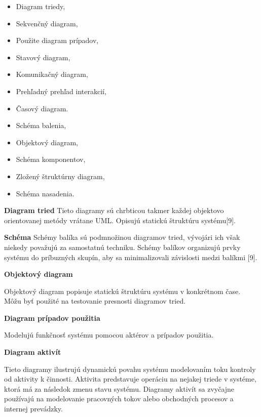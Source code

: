 \documentclass[a4paper]{feidippp}
\begin{document}
\begin{itemize}
\item	Diagram triedy,			
\item Sekvenčný diagram,
\item Použite diagram prípadov,
\item Stavový diagram,
\item Komunikačný diagram,
\item Prehľadný prehľad interakcií,
\item Časový diagram.
  
  \end{itemize}
  \begin{itemize}
      
  
\item Schéma balenia,
\item Objektový diagram,
\item Schéma komponentov,
\item Zložený štruktúrny diagram,
\item Schéma nasadenia.

\end{itemize}	


\textbf{ Diagram tried}
Tieto diagramy sú chrbticou takmer každej objektovo orientovanej metódy vrátane UML. Opisujú statickú štruktúru systému[9]. 
	
\textbf{Schéma}
Schémy balíka sú podmnožinou diagramov tried, vývojári ich však niekedy považujú za samostatnú techniku. Schémy balíkov organizujú prvky systému do príbuzných skupín, aby sa minimalizovali závislosti medzi balíkmi [9]. 



\textbf {Objektový diagram}

Objektový diagram popisuje statickú štruktúru systému v konkrétnom čase. Môžu byť použité na testovanie presnosti diagramov tried.

\textbf {Diagram prípadov použitia}

Modelujú funkčnosť systému pomocou aktérov a prípadov použitia.



\textbf {Diagram aktivít}

 	Tieto diagramy ilustrujú dynamickú povahu systému modelovaním toku kontroly od aktivity k činnosti. Aktivita predstavuje operáciu na nejakej triede v systéme, ktorá má za následok zmenu stavu systému. Diagramy aktivít sa zvyčajne používajú na modelovanie pracovných tokov alebo obchodných procesov a internej prevádzky.
  
\end{document}
